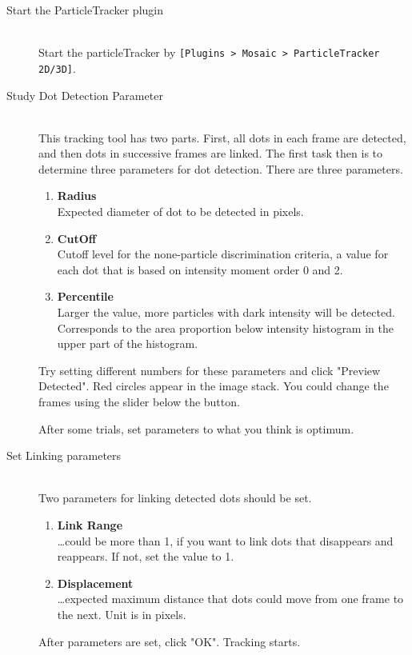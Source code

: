 \documentclass[11pnt]{article}
\begin{document}
\begin{description}
\item[Start the ParticleTracker plugin]\hfill\\

Start the particleTracker by \verb"[Plugins > Mosaic > ParticleTracker 2D/3D]". 

\item[Study Dot Detection Parameter]\hfill\\

This tracking tool has two parts. First, all dots in each frame are detected, and then dots in successive frames are linked. The first task then is to determine three parameters for dot detection. There are three parameters. 
\begin{enumerate}
\item \textbf{Radius}\hfill\\
Expected diameter of dot to be detected in pixels. 
\item \textbf{CutOff}\hfill\\
Cutoff level for the none-particle discrimination criteria, a value for each dot that is based on intensity moment order 0 and 2. 
\item \textbf{Percentile}\hfill\\
Larger the value, more particles with dark intensity will be detected. Corresponds to the area proportion below intensity histogram in the upper part of the histogram. 
\end{enumerate}
Try setting different numbers for these parameters and click "Preview Detected". Red circles appear in the image stack. You could change the frames using the slider below the button. 

After some trials, set parameters to what you think is optimum. 

\item[Set Linking parameters]\hfill\\

Two parameters for linking detected dots should be set. 
\begin{enumerate}
\item \textbf{Link Range}\hfill\\
\dots could be more than 1, if you want to link dots that disappears and reappears. If not, set the value to 1.
\item \textbf{Displacement}\hfill\\
\dots expected maximum distance that dots could move from one frame to the next. Unit is in pixels. 
\end{enumerate}
After parameters are set, click "OK". Tracking starts. 


\end{description}
\end{document}
